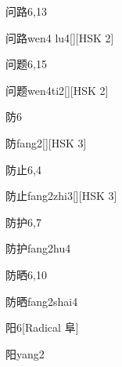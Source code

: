 \begin{entry}{问路}{6,13}
  \begin{phonetics}{问路}{wen4 lu4}[][HSK 2]
  \end{phonetics}
\end{entry}

\begin{entry}{问题}{6,15}
  \begin{phonetics}{问题}{wen4ti2}[][HSK 2]
  \end{phonetics}
\end{entry}

\begin{entry}{防}{6}
  \begin{phonetics}{防}{fang2}[][HSK 3]
  \end{phonetics}
\end{entry}

\begin{entry}{防止}{6,4}
  \begin{phonetics}{防止}{fang2zhi3}[][HSK 3]
  \end{phonetics}
\end{entry}

\begin{entry}{防护}{6,7}
  \begin{phonetics}{防护}{fang2hu4}
  \end{phonetics}
\end{entry}

\begin{entry}{防晒}{6,10}
  \begin{phonetics}{防晒}{fang2shai4}
  \end{phonetics}
\end{entry}

\begin{entry}{阳}{6}[Radical 阜]
  \begin{phonetics}{阳}{yang2}
  \end{phonetics}
\end{entry}

